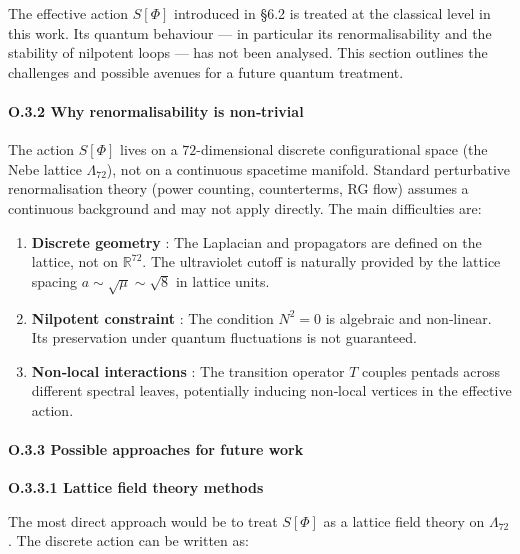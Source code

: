 \documentclass[11pt]{article}
\providecommand{\tightlist}{\setlength{\itemsep}{2pt}\setlength{\parskip}{6pt}}
\providecommand{\tightlist}{%
  \setlength{\itemsep}{2pt}\setlength{\parskip}{6pt}
}
\begin{document}
The effective action \(S[\Phi]\) introduced in §6.2 is treated at the
classical level in this work. Its quantum behaviour --- in particular
its renormalisability and the stability of nilpotent loops --- has not
been analysed. This section outlines the challenges and possible avenues
for a future quantum treatment.

\hypertarget{o.3.2-why-renormalisability-is-nontrivial}{%
\paragraph{O.3.2 Why renormalisability is
non‑trivial}\label{o.3.2-why-renormalisability-is-nontrivial}}

The action \(S[\Phi]\) lives on a \(72\)-dimensional discrete
configurational space (the Nebe lattice \(\Lambda_{72}\)), not on a
continuous spacetime manifold. Standard perturbative renormalisation
theory (power counting, counterterms, RG flow) assumes a continuous
background and may not apply directly. The main difficulties are:

\begin{enumerate}
\def\labelenumi{\arabic{enumi}.}
\tightlist
\item
  \textbf{Discrete geometry} : The Laplacian and propagators are defined
  on the lattice, not on \(\mathbb{R}^{72}\). The ultraviolet cutoff is
  naturally provided by the lattice spacing
  \(a \sim \sqrt{\mu} \sim \sqrt{8}\) in lattice units.
\item
  \textbf{Nilpotent constraint} : The condition \(N^2 = 0\) is algebraic
  and non‑linear. Its preservation under quantum fluctuations is not
  guaranteed.
\item
  \textbf{Non‑local interactions} : The transition operator \(T\)
  couples pentads across different spectral leaves, potentially inducing
  non‑local vertices in the effective action.
\end{enumerate}

\hypertarget{o.3.3-possible-approaches-for-future-work}{%
\paragraph{O.3.3 Possible approaches for future
work}\label{o.3.3-possible-approaches-for-future-work}}

\textbf{O.3.3.1 Lattice field theory methods}

The most direct approach would be to treat \(S[\Phi]\) as a lattice
field theory on \(\Lambda_{72}\). The discrete action can be written as:
\end{document}
